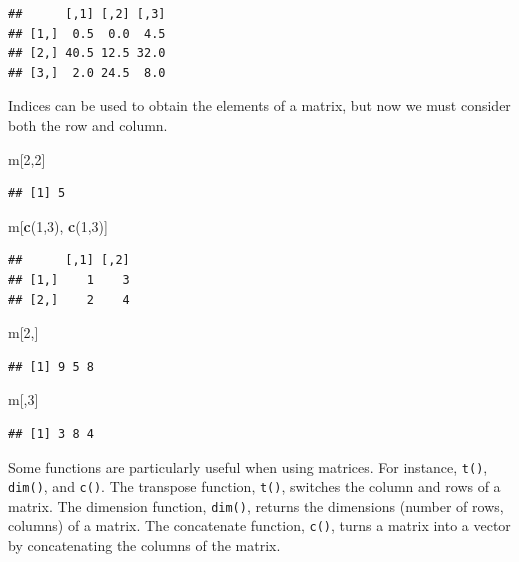 \documentclass[
]{book}
\newenvironment{Shaded}{\begin{snugshade}}{\end{snugshade}}
\newcommand{\DecValTok}[1]{\textcolor[rgb]{0.00,0.00,0.81}{#1}}
\newcommand{\KeywordTok}[1]{\textcolor[rgb]{0.13,0.29,0.53}{\textbf{#1}}}
\newcommand{\NormalTok}[1]{#1}
\begin{document}
\begin{verbatim}
##      [,1] [,2] [,3]
## [1,]  0.5  0.0  4.5
## [2,] 40.5 12.5 32.0
## [3,]  2.0 24.5  8.0
\end{verbatim}

Indices can be used to obtain the elements of a matrix, but now we must consider both the row and column.

\begin{Shaded}
\begin{Highlighting}[]
\NormalTok{m[}\DecValTok{2}\NormalTok{,}\DecValTok{2}\NormalTok{]}
\end{Highlighting}
\end{Shaded}

\begin{verbatim}
## [1] 5
\end{verbatim}

\begin{Shaded}
\begin{Highlighting}[]
\NormalTok{m[}\KeywordTok{c}\NormalTok{(}\DecValTok{1}\NormalTok{,}\DecValTok{3}\NormalTok{), }\KeywordTok{c}\NormalTok{(}\DecValTok{1}\NormalTok{,}\DecValTok{3}\NormalTok{)]}
\end{Highlighting}
\end{Shaded}

\begin{verbatim}
##      [,1] [,2]
## [1,]    1    3
## [2,]    2    4
\end{verbatim}

\begin{Shaded}
\begin{Highlighting}[]
\NormalTok{m[}\DecValTok{2}\NormalTok{,]}
\end{Highlighting}
\end{Shaded}

\begin{verbatim}
## [1] 9 5 8
\end{verbatim}

\begin{Shaded}
\begin{Highlighting}[]
\NormalTok{m[,}\DecValTok{3}\NormalTok{]}
\end{Highlighting}
\end{Shaded}

\begin{verbatim}
## [1] 3 8 4
\end{verbatim}

Some functions are particularly useful when using matrices. For instance, \texttt{t()}, \texttt{dim()}, and \texttt{c()}. The transpose function, \texttt{t()}, switches the column and rows of a matrix. The dimension function, \texttt{dim()}, returns the dimensions (number of rows, columns) of a matrix. The concatenate function, \texttt{c()}, turns a matrix into a vector by concatenating the columns of the matrix.
\end{document}
